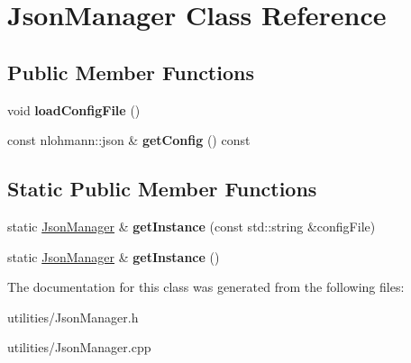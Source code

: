 \hypertarget{classJsonManager}{\section{Json\-Manager Class Reference}
\label{classJsonManager}
}
\subsection*{Public Member Functions}
\begin{DoxyCompactItemize}
\item 
\hypertarget{classJsonManager_a60379eeadbb62ebe5e2f60f6b4f0c3aa}{void {\bfseries load\-Config\-File} ()}\label{classJsonManager_a60379eeadbb62ebe5e2f60f6b4f0c3aa}

\item 
\hypertarget{classJsonManager_aeca8eacf970dc772263dc389f7ecd74a}{const nlohmann\-::json \& {\bfseries get\-Config} () const }\label{classJsonManager_aeca8eacf970dc772263dc389f7ecd74a}

\end{DoxyCompactItemize}
\subsection*{Static Public Member Functions}
\begin{DoxyCompactItemize}
\item 
\hypertarget{classJsonManager_a195c89b9868a39e6dfbacd9a491617d7}{static \hyperlink{classJsonManager}{Json\-Manager} \& {\bfseries get\-Instance} (const std\-::string \&config\-File)}\label{classJsonManager_a195c89b9868a39e6dfbacd9a491617d7}

\item 
\hypertarget{classJsonManager_a614ccaaeebd7be1f35f12657c988b887}{static \hyperlink{classJsonManager}{Json\-Manager} \& {\bfseries get\-Instance} ()}\label{classJsonManager_a614ccaaeebd7be1f35f12657c988b887}

\end{DoxyCompactItemize}


The documentation for this class was generated from the following files\-:\begin{DoxyCompactItemize}
\item 
utilities/Json\-Manager.\-h\item 
utilities/Json\-Manager.\-cpp\end{DoxyCompactItemize}
